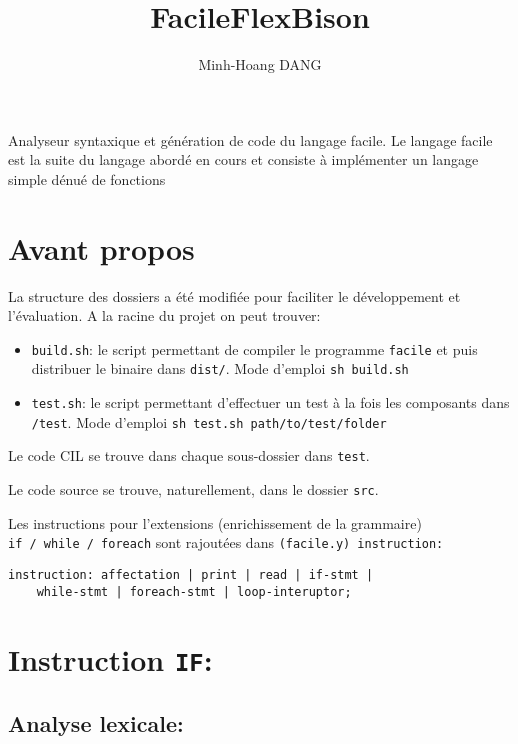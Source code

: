 \documentclass[11pt]{article}
\title{FacileFlexBison}
\author{Minh-Hoang DANG}
\begin{document}
    
    
    \maketitle
    
    

    
    Analyseur syntaxique et génération de code du langage facile. Le langage
facile est la suite du langage abordé en cours et consiste à implémenter
un langage simple dénué de fonctions

\hypertarget{avant-propos}{%
\section{Avant propos}\label{avant-propos}}

La structure des dossiers a été modifiée pour faciliter le développement
et l'évaluation. A la racine du projet on peut trouver:

\begin{itemize}
\item
  \texttt{build.sh}: le script permettant de compiler le programme
  \texttt{facile} et puis distribuer le binaire dans \texttt{dist/}.
  Mode d'emploi \texttt{sh\ build.sh}
\item
  \texttt{test.sh}: le script permettant d'effectuer un test à la fois
  les composants dans \texttt{/test}. Mode d'emploi
  \texttt{sh\ test.sh\ path/to/test/folder}
\end{itemize}

Le code CIL se trouve dans chaque sous-dossier dans \texttt{test}.

Le code source se trouve, naturellement, dans le dossier \texttt{src}.

Les instructions pour l'extensions (enrichissement de la grammaire)
\texttt{if\ /\ while\ /\ foreach} sont rajoutées dans
\texttt{(facile.y)\ instruction:}

\begin{verbatim}
instruction: affectation | print | read | if-stmt | 
    while-stmt | foreach-stmt | loop-interuptor;
\end{verbatim}

    \hypertarget{instruction-if}{%
\section{\texorpdfstring{Instruction
\texttt{IF}:}{Instruction IF:}}\label{instruction-if}}

    \hypertarget{analyse-lexicale}{%
\subsection{Analyse lexicale:}\label{analyse-lexicale}}
\end{document}
